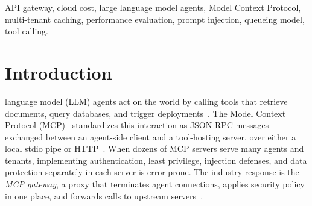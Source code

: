 \documentclass{ieeeaccess}
\begin{document}
\begin{keywords}
API gateway, cloud cost, large language model agents, Model Context Protocol, multi-tenant caching, performance evaluation, prompt injection, queueing model, tool calling.
\end{keywords}

\titlepgskip=-21pt

\maketitle

\section{Introduction}
\label{sec:intro}

 language model (LLM) agents act on the world by calling tools that retrieve documents, query databases, and trigger deployments~\cite{schick2023toolformer,yao2023react,qin2024toolllm,patil2024gorilla}. The Model Context Protocol (MCP)~\cite{anthropic2024mcp} standardizes this interaction as JSON-RPC messages exchanged between an agent-side client and a tool-hosting server, over either a local stdio pipe or HTTP~\cite{mcpspec20241105,mcpspec20250326,mcpspec20260728}. When dozens of MCP servers serve many agents and tenants, implementing authentication, least privilege, injection defenses, and data protection separately in each server is error-prone. The industry response is the \emph{MCP gateway}, a proxy that terminates agent connections, applies security policy in one place, and forwards calls to upstream servers~\cite{brett2025simplified,narajala2025enterprise,errico2025securing,kumar2026gateway,li2026zerotrust}.
\end{document}
